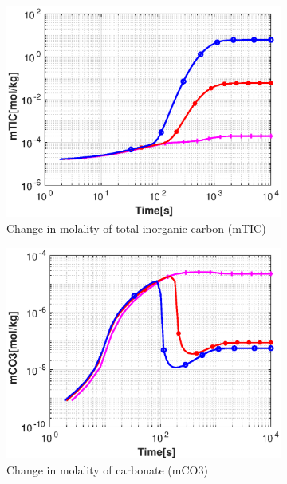 \begin{figure}[!h]
        \hfill
    \begin{subfigure}{.5\linewidth}
            \centering
        \includegraphics[width=\textwidth]{PICTURES/with_CO2_mTIC.eps}
        \caption{Change in molality of total inorganic carbon (mTIC)}
        \label{fig:CO2mTIC}
    \end{subfigure}%
    \hfill
    \begin{subfigure}{.5\linewidth}
            \centering
        \includegraphics[width=\textwidth]{PICTURES/with_CO2_mCO3.eps}
        \caption{\small Change in molality of carbonate (mCO3)}
        \label{fig:CO2mCO3}
    \end{subfigure}%
    \hfill
    \begin{subfigure}{.5\linewidth}

\end{subfigure}
\end{figure}
